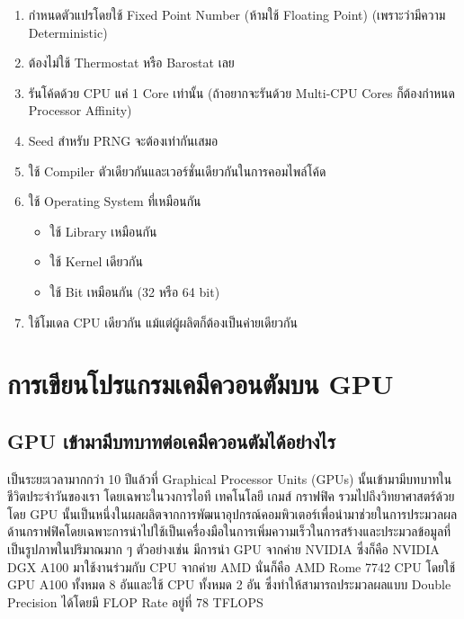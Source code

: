 \begin{enumerate}[topsep=0pt,noitemsep]
  \item กำหนดตัวแปรโดยใช้ Fixed Point Number (ห้ามใช้ Floating Point) (เพราะว่ามีความ Deterministic)

  \item ต้องไม่ใช้ Thermostat หรือ Barostat เลย

  \item รันโค้ดด้วย CPU แค่ 1 Core เท่านั้น (ถ้าอยากจะรันด้วย Multi-CPU Cores ก็ต้องกำหนด Processor Affinity)

  \item Seed สำหรับ PRNG จะต้องเท่ากันเสมอ

  \item ใช้ Compiler ตัวเดียวกันและเวอร์ชั่นเดียวกันในการคอมไพล์โค้ด

  \item ใช้ Operating System ที่เหมือนกัน
        \begin{itemize}[topsep=0pt,noitemsep]
          \item ใช้ Library เหมือนกัน

          \item ใช้ Kernel เดียวกัน

          \item ใช้ Bit เหมือนกัน (32 หรือ 64 bit)
        \end{itemize}

  \item ใช้โมเดล CPU เดียวกัน แม้แต่ผู้ผลิตก็ต้องเป็นค่ายเดียวกัน
\end{enumerate}

\section{การเขียนโปรแกรมเคมีควอนตัมบน GPU}

\subsection{GPU เข้ามามีบทบาทต่อเคมีควอนตัมได้อย่างไร}

เป็นระยะเวลามากกว่า 10 ปีแล้วที่ Graphical Processor Units (GPUs) นั้นเข้ามามีบทบาทในชีวิตประจำวันของเรา โดยเฉพาะในวงการไอที
เทคโนโลยี เกมส์ กราฟฟิค รวมไปถึงวิทยาศาสตร์ด้วย โดย GPU นั้นเป็นหนึ่งในผลผลิตจากการพัฒนาอุปกรณ์คอมพิวเตอร์เพื่อนำมาช่วยในการประมวลผล%
ด้านกราฟฟิคโดยเฉพาะการนำไปใช้เป็นเครื่องมือในการเพิ่มความเร็วในการสร้างและประมวลข้อมูลที่เป็นรูปภาพในปริมาณมาก ๆ ตัวอย่างเช่น
มีการนำ GPU จากค่าย NVIDIA ซึ่งก็คือ NVIDIA DGX A100 มาใช้งานร่วมกับ CPU จากค่าย AMD นั่นก็คือ AMD Rome 7742 CPU โดยใช้ GPU
A100 ทั้งหมด 8 อันและใช้ CPU ทั้งหมด 2 อัน ซึ่งทำให้สามารถประมวลผลแบบ Double Precision ได้โดยมี FLOP Rate อยู่ที่ 78 TFLOPS

